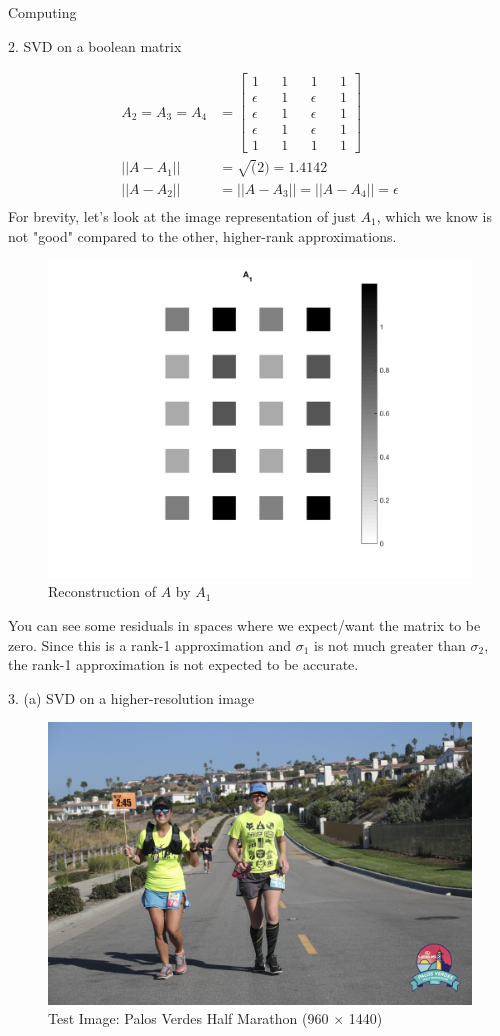 \begin{section}{Computing}
\begin{homeworkSection}{2. SVD on a boolean matrix}
{\begin{align*}
        A_2 = A_3 = A_4 &= \begin{bmatrix} 1 && 1 && 1 && 1\\ 
        \epsilon && 1 && \epsilon && 1\\ 
        \epsilon && 1 && \epsilon && 1\\ 
        \epsilon && 1 && \epsilon && 1\\ 
        1 && 1 && 1 && 1\end{bmatrix} \\ 
        ||A- A_1|| &= \sqrt(2) = 1.4142 \\
        ||A- A_2|| &=  ||A- A_3|| = ||A- A_4|| = \epsilon \\
    \end{align*}
    For brevity, let's look at the image representation of just $A_1$, which we know is not "good" compared to the other, higher-rank approximations.
    \begin{figure}[H]
    \centering
    \includegraphics[width=0.35\columnwidth]{../data/Prob2_1}
    \caption{Reconstruction of $A$ by $A_1$}
    \label{fig:p2_1}
    \end{figure}
    You can see some residuals in spaces where we expect/want the matrix to be zero. Since this is a rank-1 approximation and $\sigma_1$ is not much greater than $\sigma_2$, the rank-1 approximation is not expected to be accurate.
}
\end{homeworkSection}


\begin{homeworkSection}{3. (a) SVD on a higher-resolution image}


\begin{figure}[H]
\centering
\includegraphics[width=0.95\columnwidth]{../data/testim}
\caption{Test Image: Palos Verdes Half Marathon (960 $\times$ 1440)}
\label{fig:myim}
\end{figure}



\end{homeworkSection}
\end{section}
